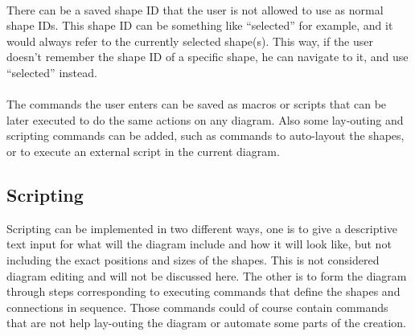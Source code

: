 \paragraph{}
There can be a saved shape ID that the user is not allowed to use as normal shape IDs. This shape ID can be something like ``selected'' for example, and it would always refer to the currently selected shape(s). This way, if the user doesn't remember the shape ID of a specific shape, he can navigate to it, and use ``selected'' instead.

\paragraph{}
The commands the user enters can be saved as macros or scripts that can be later executed to do the same actions on any diagram. Also some lay-outing and scripting commands can be added, such as commands to auto-layout the shapes, or to execute an external script in the current diagram.

\subsection{Scripting}
Scripting can be implemented in two different ways, one is to give a descriptive text input for what will the diagram include and how it will look like, but not including the exact positions and sizes of the shapes. This is not considered diagram editing and will not be discussed here. The other is to form the diagram through steps corresponding to executing commands that define the shapes and connections in sequence. Those commands could of course contain commands that are not help lay-outing the diagram or automate some parts of the creation. 

\begin{comment}
BY CHRISTIANE
 I think you should also discuss a combination of all the methods mentioned. I think a combination would be the most feasible. You should somehow state this. 
The combination of keyboard accelerators and menu based editing is already done in many tools.
Maybe you should also briefly discuss the keyboard editing via navigating through standard tool-bars and menus by arrow keys or tab key. Of course, this is no good method. But as it is used in many tools it should be discussed here, I think. Furthermore, this method has the advantage that really every functionality of a diagramming tool could be activated if it is placed in some menu or toolbar.
\end{comment}


